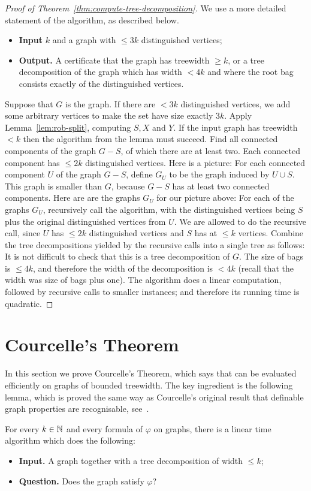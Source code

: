 \begin{proof}[Proof of Theorem~\ref{thm:compute-tree-decomposition}]
We use a more detailed   statement of the algorithm, as described below. 
\begin{itemize}
	\item {\bf Input} $k$ and a graph with   $\le 3k$ distinguished vertices;
\item {\bf Output.}  A certificate that the graph has treewidth $\ge k$, or a tree decomposition of the graph which has width  $<4k$ and where the root bag consists exactly of the distinguished vertices.
\end{itemize}
Suppose that $G$ is the graph. If there are  $< 3k$ distinguished vertices, we add some arbitrary vertices to make the set have size exactly $3k$. Apply Lemma~\ref{lem:rob-split}, computing $S,X$ and $Y$. If the input graph has treewidth $<k$ then the algorithm from the lemma must succeed. Find all connected components of the graph $G-S$, of which there are at least two. Each connected component has   $ \le 2k$ distinguished vertices. Here is a picture: 
For each connected component $U$ of the graph $G-S$, define $G_U$ to be the graph induced by $U \cup S$. This graph is smaller than $G$, because $G-S$ has at least two connected components. Here are are the graphs $G_U$ for our picture above:
For each of the graphs $G_U$, 
 recursively call the algorithm, with the distinguished vertices being $S$ plus the original distinguished vertices from $U$. We are allowed to do the recursive call, since $U$ has   $\le 2k$ distinguished vertices and $S$ has at $ \le k$ vertices. Combine the tree decompositions yielded by the recursive calls into a single tree as follows:
 It is not difficult to check that this is a tree decomposition of $G$. The size of bags is $\le 4k$, and therefore the width of the decomposition is $< 4k$ (recall that the width was size of bags plus one). The algorithm does a linear computation, followed by recursive calls to smaller instances; and therefore its running time is quadratic. 
\end{proof}

\section{Courcelle's Theorem}
In this section we prove Courcelle's Theorem, which says that \mso can be evaluated efficiently on graphs of bounded treewidth. The key ingredient is the following lemma, which is proved the same way as Courcelle's original result that \mso definable graph properties are recognisable, see~\cite[Theorem 4.4]{Courcelle:1990fj}.
\begin{lemma}\label{lem:courcelle}
	For every $k \in \mathbb{N}$ and every formula of \mso $\varphi$ on graphs, there is a linear time algorithm which does the following:
	\begin{itemize}
		\item {\bf Input.} A graph together with a tree decomposition of width $\le k$;
		\item {\bf Question.} Does the graph satisfy $\varphi$?
	\end{itemize}
\end{lemma}

